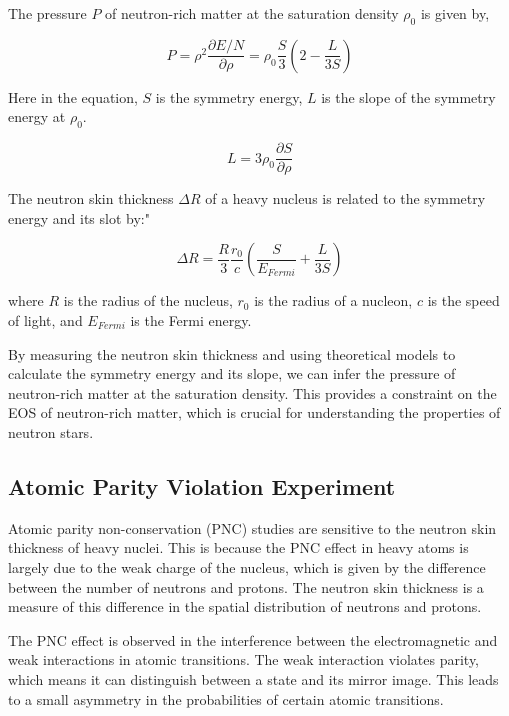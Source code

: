 The pressure $P$ of neutron-rich matter at the saturation density $\rho_0$ is given by,

\begin{equation}
    P = \rho^2\frac{\partial{E/N}}{\partial{\rho}} = \rho_0\frac{S}{3}(2-\frac{L}{3S})
\end{equation}

Here in the equation, $S$ is the symmetry energy, $L$ is the slope of the symmetry energy at $\rho_0$.

\begin{equation}
    L  = 3\rho_0\frac{\partial{S}}{\partial{\rho}}
\end{equation}

The neutron skin thickness $\Delta{R}$ of a heavy nucleus is related to the symmetry energy and its slot by:"

\begin{equation}
    \Delta{R} = \frac{R}{3}\frac{r_0} {c}(\frac{S}{E_{Fermi}} + \frac{L}{3S})
\end{equation}

where $R$ is the radius of the nucleus, $r_0$ is the radius of a nucleon, $c$ is the speed of light, and $E_{Fermi}$ is the Fermi energy.

By measuring the neutron skin thickness and using theoretical models to calculate the symmetry energy and its slope, we can infer the pressure of neutron-rich matter at the saturation density. This provides a constraint on the EOS of neutron-rich matter, which is crucial for understanding the properties of neutron stars.

\subsection{Atomic Parity Violation Experiment}

Atomic parity non-conservation (PNC) studies are sensitive to the neutron skin thickness of heavy nuclei. This is because the PNC effect in heavy atoms is largely due to the weak charge of the nucleus, which is given by the difference between the number of neutrons and protons. The neutron skin thickness is a measure of this difference in the spatial distribution of neutrons and protons.

The PNC effect is observed in the interference between the electromagnetic and weak interactions in atomic transitions. The weak interaction violates parity, which means it can distinguish between a state and its mirror image. This leads to a small asymmetry in the probabilities of certain atomic transitions.

